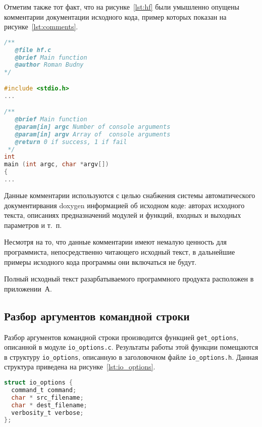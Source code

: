 Отметим также тот факт, что на рисунке~\ref{lst:hf} были умышленно опущены
комментарии документации исходного кода, пример которых показан на 
рисунке~\ref{lst:comments}.

\begin{lstlisting}[basicstyle=\scriptsize\ttfamily,
                   numberstyle=\scriptsize\ttfamily,
                   xleftmargin=7mm,
                   language=C,caption=Пример документации исходного кода,
                   label=lst:comments]
/**
   @file hf.c
   @brief Main function
   @author Roman Budny
*/

#include <stdio.h>
...

/**
   @brief Main function
   @param[in] argc Number of console arguments
   @param[in] argv Array of  console arguments
   @return 0 if success, 1 if fail
 */
int
main (int argc, char *argv[])
{
...
\end{lstlisting}

Данные комментарии используются с целью снабжения системы 
автоматического документирвания doxygen информацией об исходном коде:
авторах исходного текста, описаниях предназначений модулей и функций,
входных и выходных параметров и т.~п. 

Несмотря на то, что данные комментарии имеют немалую ценность для программиста,
непосредственно читающего исходный текст, в дальнейшие примеры исходного кода
программы они включаться не будут.

Полный исходный текст разарбатываемого программного продукта
расположен в приложении~А. 

\subsection{Разбор аргументов командной строки}

Разбор аргументов командной строки производится функцией \texttt{get\_options},
описанной в модуле \texttt{io\_options.c}. Результаты работы этой функции помещаются в 
структуру \texttt{io\_options}, описанную в заголовочном файле \texttt{io\_options.h}.
Данная структура приведена на рисунке~\ref{lst:io_options}.

\begin{lstlisting}[basicstyle=\scriptsize\ttfamily,
                   numberstyle=\scriptsize\ttfamily,
                   xleftmargin=7mm,
                   language=C,caption=Структура io\_options,
                   label=lst:io_options]
struct io_options {
  command_t command;
  char * src_filename;
  char * dest_filename;
  verbosity_t verbose;
};
\end{lstlisting}

